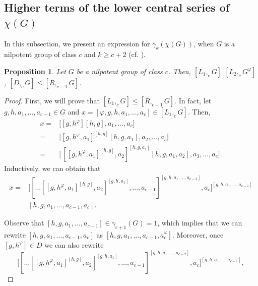 \documentclass[12pt,leqno]{amsart}
\newtheorem{prop}[theorem]{\sc Proposition}
\begin{document}
\subsection{Higher terms of the lower central series of \texorpdfstring{$\chi(G)$}{χ(G)}}


In this subsection, we present an expression for $\gamma_{k}(\chi(G))$, when $G$ is a nilpotent group of class $c$ and $k \geq c+2$ (cf. \cite[Theorem 3.3]{GRS}).

\begin{prop}\label{PropR>D}
    Let $G$ be a nilpotent group of class $c$. Then, $
    [L_1,_{c}G]$ $[L_2,_{c}G^{\varphi}]$, $[D,_{c}G] \leq [R,_{c-1}G]$.
\end{prop}

\begin{proof}First, we will prove that $[L_1,_{c}G] \leq [R,_{c-1}G]$. 
    In fact, let $g,h,a_1, \ldots , a_{c-1}\in G$ and $x=[\varphi,g,h,a_1,\ldots ,a_{c}]\in [L_1,_cG]$. Then, 
    \begin{align*}
        x=& \big[[g,h^{\varphi}][h,g],a_1,\ldots ,a_{c}\big]\\
        =& \big[[g,h^{\varphi},a_1]^{[h,g]}[h,g,a_1],a_2, \ldots ,a_{c}\big]\\
         =& \big[ \, [[g,h^{\varphi},a_1]^{[h,g]},a_2]^{[h,g,a_1]} [h,g,a_1,a_2], a_3, \ldots ,a_{c}\big].
        \end{align*}
    Inductively,  we can obtain that
        \begin{align*}
        x=&\big [ [\ldots[[g,h^{\varphi},a_{1}]^{[h,g]},a_{2}]^{[g,h,a_{1}]}, \ldots ,a_{c-1}]^{[g,h,a_{1}, \ldots ,a_{c-2}]} , a_c \big]^{[g,h,a_{1}, \ldots, a_{c-1}]}\\
        & [h,g,a_1, \ldots ,a_{c-1}, a_{c}]. 
        \end{align*}
        
        Observe that $[h,g,a_1, \ldots ,a_{c-1}]\in \gamma_{c+1}(G)=1$, which implies that we can rewrite $[h,g,a_1, \ldots ,a_{c-1}, a_{c}]$ as $[h,g,a_1, \ldots ,a_{c-1}, a^{\varphi}_{c}]$. Moreover, once $[g,h^{\varphi}]\in D$ we can also rewrite 
        \[
\big [ [\ldots[[g,h^{\varphi},a_{1}]^{[h,g]},a_{2}]^{[g,h,a_{1}]}, \ldots ,a_{c-1}]^{[g,h,a_{1}, \ldots ,a_{c-2}]} , a_c \big]^{[g,h,a_{1}, \ldots, a_{c-1}]},
        \]
        

\end{proof}
\end{document}
